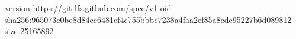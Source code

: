 version https://git-lfs.github.com/spec/v1
oid sha256:965073c0be8d84cc6481cf4c755bbbc7238a4faa2ef85a8cde95227b6d089812
size 25165892
